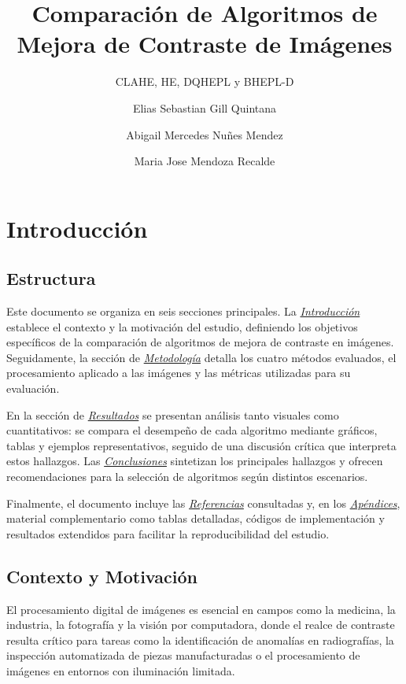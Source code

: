 \documentclass[sigchi]{acmart}
\title{Comparación de Algoritmos de Mejora de Contraste de Imágenes}
\subtitle{CLAHE, HE, DQHEPL y BHEPL-D}
\author{Elias Sebastian Gill Quintana}
\affiliation{
    \institution{Facultad Politecnica - UNA}
    \city{San Lorenzo}
    \country{Paraguay}
}
\author{Abigail Mercedes Nuñes Mendez}
\affiliation{
    \institution{Facultad Politecnica - UNA}
    \city{San Lorenzo}
    \country{Paraguay}
}
\author{Maria Jose Mendoza Recalde}
\affiliation{
    \institution{Facultad Politecnica - UNA}
    \city{San Lorenzo}
    \country{Paraguay}
}
\begin{document}
\maketitle

\section{Introducción}

\subsection{Estructura}
\label{subsec:estructura}

Este documento se organiza en seis secciones principales. La
\emph{\hyperref[sec:contexto]{Introducción}} establece el contexto y la motivación del
estudio, definiendo los objetivos específicos de la comparación de algoritmos de mejora de
contraste en imágenes. Seguidamente, la sección de
\emph{\hyperref[sec:metodologia]{Metodología}} detalla los cuatro métodos evaluados, el
procesamiento aplicado a las imágenes y las métricas utilizadas para su evaluación.

En la sección de \emph{\hyperref[sec:resultados]{Resultados}} se presentan análisis tanto
visuales como cuantitativos: se compara el desempeño de cada algoritmo mediante gráficos,
tablas y ejemplos representativos, seguido de una discusión crítica que interpreta estos
hallazgos. Las \emph{\hyperref[sec:conclusiones]{Conclusiones}} sintetizan los principales
hallazgos y ofrecen recomendaciones para la selección de algoritmos según distintos escenarios.

Finalmente, el documento incluye las \emph{\hyperref[sec:bibliography]{Referencias}} consultadas
y, en los \emph{\hyperref[sec:apendices]{Apéndices}}, material complementario como tablas
detalladas, códigos de implementación y resultados extendidos para facilitar la
reproducibilidad del estudio.

\subsection{Contexto y Motivación}
\label{subsec:contexto}

El procesamiento digital de imágenes es esencial en campos como la medicina, la industria, la
fotografía y la visión por computadora, donde el realce de contraste resulta crítico para
tareas como la identificación de anomalías en radiografías, la inspección automatizada de
piezas manufacturadas o el procesamiento de imágenes en entornos con iluminación limitada.
\end{document}

